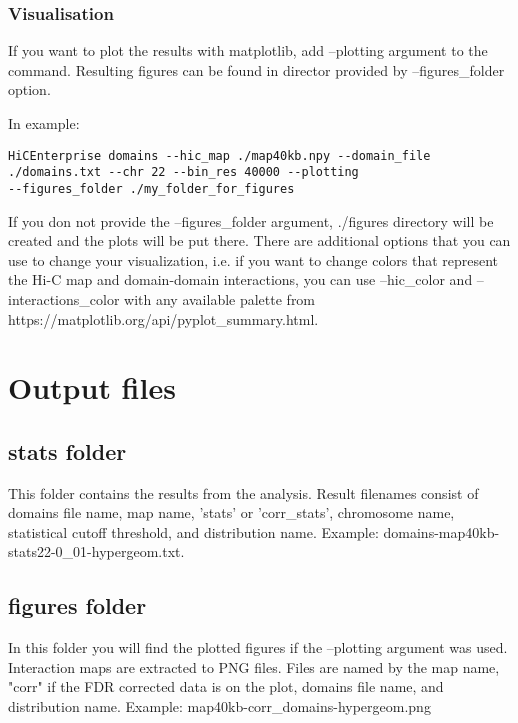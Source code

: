 \subsubsection{Visualisation} %

If you want to plot the results with matplotlib, add --plotting argument to the command. Resulting figures can be found
in director provided by --figures\_folder option.

In example:
\begin{lstlisting}
HiCEnterprise domains --hic_map ./map40kb.npy --domain_file
./domains.txt --chr 22 --bin_res 40000 --plotting
--figures_folder ./my_folder_for_figures
\end{lstlisting}


If you don not provide the --figures\_folder argument, ./figures directory will be created and the plots will be put
there. There are additional options that you can use to change your visualization, i.e. if you want to change colors that
represent the Hi-C map and domain-domain interactions, you can use --hic\_color and --interactions\_color with any
available palette from https://matplotlib.org/api/pyplot\_summary.html.

\section{Output files}

\subsection{stats folder}
This folder contains the results from the analysis. Result filenames consist of domains file name, map name,
'stats' or 'corr\_stats', chromosome name, statistical cutoff threshold, and distribution name. Example:
domains-map40kb-stats22-0\_01-hypergeom.txt.

\subsection{figures folder}
In this folder you will find the plotted figures if the --plotting argument was used. Interaction maps are
extracted to PNG files. Files are named by the map name, "corr" if the FDR corrected data is on the plot, domains file
name, and distribution name. Example: map40kb-corr\_domains-hypergeom.png

